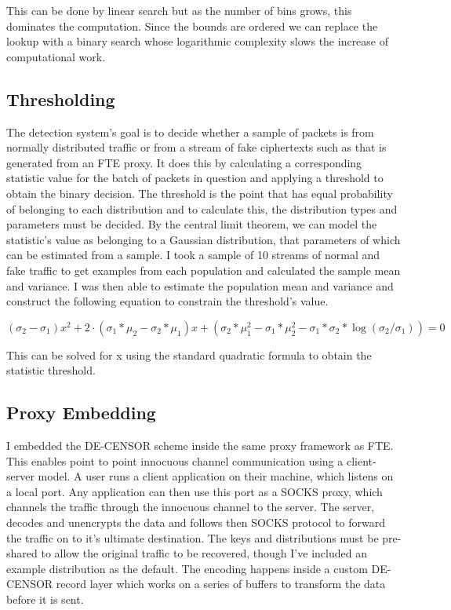 \documentclass[ %
                    author={Samuel Russell},
                supervisor={Prof. Bogdan Warinschi},
                    degree={MEng},
                     title={Innocuous Ciphertexts},
                  subtitle={The DE-CENSOR Scheme},
                      type={research},
                      year={2018} ]{dissertation}
\begin{document}
This can be done by linear search but as the number of bins grows, this dominates the computation.
Since the bounds are ordered we can replace the lookup with a binary search whose logarithmic complexity slows the increase of computational work.

\subsection{Thresholding}

The detection system's goal is to decide whether a sample of packets is from normally distributed traffic or from a stream of fake ciphertexts such as that is generated from an FTE proxy.
It does this by calculating a corresponding statistic value for the batch of packets in question and applying a threshold to obtain the binary decision.
The threshold is the point that has equal probability of belonging to each distribution and to calculate this, the distribution types and parameters must be decided.
By the central limit theorem, we can model the statistic's value as belonging to a Gaussian distribution, that parameters of which can be estimated from a sample.
I took a sample of 10 streams of normal and fake traffic to get examples from each population and calculated the sample mean and variance. I was then able to estimate the population mean and variance and construct the following equation to constrain the threshold's value.

$$(\sigma_2-\sigma_1) x^2 + 2\cdot (\sigma_1*\mu_2 - \sigma_2*\mu_1) x +  (\sigma_2*\mu_1^2 - \sigma_1*\mu_2^2 - \sigma_1*\sigma_2*\log(\sigma_2/\sigma_1)) = 0$$

This can be solved for x using the standard quadratic formula to obtain the statistic threshold.

\subsection{Proxy Embedding}

I embedded the DE-CENSOR scheme inside the same proxy framework as FTE.
This enables point to point innocuous channel communication using a client-server model.
A user runs a client application on their machine, which listens on a local port.
Any application can then use this port as a SOCKS proxy, which channels the traffic through the innocuous channel to the server.
The server, decodes and unencrypts the data and follows then SOCKS protocol to forward the traffic on to it's ultimate destination.
The keys and distributions must be pre-shared to allow the original traffic to be recovered, though I've included an example distribution as the default.
The encoding happens inside a custom DE-CENSOR record layer which works on a series of buffers to transform the data before it is sent.
\end{document}
